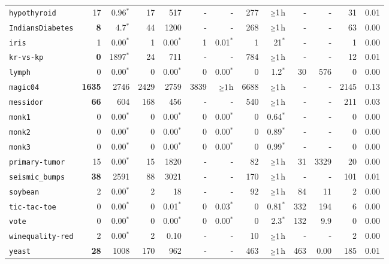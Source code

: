 \begin{tabular}{lrrrrrrrrrrrr}
\texttt{hypothyroid} & 17 & 0.96$^*$ & 17 & 517 & - & - & 277 & $\mathsmaller{\geq}1$h & - & - & 31 & 0.01\\
\texttt{IndiansDiabetes} & \textbf{8} & 4.7$^*$ & 44 & 1200 & - & - & 268 & $\mathsmaller{\geq}1$h & - & - & 63 & 0.00\\
\texttt{iris} & 1 & 0.00$^*$ & 1 & 0.00$^*$ & 1 & 0.01$^*$ & 1 & 21$^*$ & - & - & 1 & 0.00\\
\texttt{kr-vs-kp} & \textbf{0} & 1897$^*$ & 24 & 711 & - & - & 784 & $\mathsmaller{\geq}1$h & - & - & 12 & 0.01\\
\texttt{lymph} & 0 & 0.00$^*$ & 0 & 0.00$^*$ & 0 & 0.00$^*$ & 0 & 1.2$^*$ & 30 & 576 & 0 & 0.00\\
\texttt{magic04} & \textbf{1635} & 2746 & 2429 & 2759 & 3839 & $\mathsmaller{\geq}1$h & 6688 & $\mathsmaller{\geq}1$h & - & - & 2145 & 0.13\\
\texttt{messidor} & \textbf{66} & 604 & 168 & 456 & - & - & 540 & $\mathsmaller{\geq}1$h & - & - & 211 & 0.03\\
\texttt{monk1} & 0 & 0.00$^*$ & 0 & 0.00$^*$ & 0 & 0.00$^*$ & 0 & 0.64$^*$ & - & - & 0 & 0.00\\
\texttt{monk2} & 0 & 0.00$^*$ & 0 & 0.00$^*$ & 0 & 0.00$^*$ & 0 & 0.89$^*$ & - & - & 0 & 0.00\\
\texttt{monk3} & 0 & 0.00$^*$ & 0 & 0.00$^*$ & 0 & 0.00$^*$ & 0 & 0.99$^*$ & - & - & 0 & 0.00\\
\texttt{primary-tumor} & 15 & 0.00$^*$ & 15 & 1820 & - & - & 82 & $\mathsmaller{\geq}1$h & 31 & 3329 & 20 & 0.00\\
\texttt{seismic\_bumps} & \textbf{38} & 2591 & 88 & 3021 & - & - & 170 & $\mathsmaller{\geq}1$h & - & - & 101 & 0.01\\
\texttt{soybean} & 2 & 0.00$^*$ & 2 & 18 & - & - & 92 & $\mathsmaller{\geq}1$h & 84 & 11 & 2 & 0.00\\
\texttt{tic-tac-toe} & 0 & 0.00$^*$ & 0 & 0.01$^*$ & 0 & 0.03$^*$ & 0 & 0.81$^*$ & 332 & 194 & 6 & 0.00\\
\texttt{vote} & 0 & 0.00$^*$ & 0 & 0.00$^*$ & 0 & 0.00$^*$ & 0 & 2.3$^*$ & 132 & 9.9 & 0 & 0.00\\
\texttt{winequality-red} & 2 & 0.00$^*$ & 2 & 0.10 & - & - & 10 & $\mathsmaller{\geq}1$h & - & - & 2 & 0.00\\
\texttt{yeast} & \textbf{28} & 1008 & 170 & 962 & - & - & 463 & $\mathsmaller{\geq}1$h & 463 & 0.00 & 185 & 0.01\\
\bottomrule
\end{tabular}
